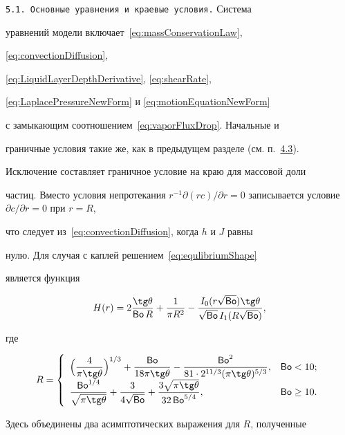 \texttt{5.1. Основные уравнения и краевые условия.} Система

уравнений модели включает~\eqref{eq:massConservationLaw},

\eqref{eq:convectionDiffusion},

\eqref{eq:LiquidLayerDepthDerivative}, \eqref{eq:shearRate},

\eqref{eq:LaplacePressureNewForm} и \eqref{eq:motionEquationNewForm}

с замыкающим соотношением~\eqref{eq:vaporFluxDrop}. Начальные и

граничные условия такие же, как в предыдущем разделе (см. п.~\hyperlink{kol:4.3}{4.3}).

Исключение составляет граничное условие на краю для массовой доли

частиц. Вместо условия непротекания $r^{-1}\partial (rc)/\partial r

= 0$ записывается условие $\partial c/\partial r = 0$ при $r = R$,

что следует из~\eqref{eq:convectionDiffusion}, когда $h$ и $J$ равны

нулю. Для случая с каплей решением~\eqref{eq:equlibriumShape}

является функция

$$

H(r) = 2\frac{\tg \theta}{\Bo R} + \frac{1}{\pi R^2} - \frac{I_0

( r\sqrt{\Bo} ) \tg \theta}{\sqrt{\Bo}\, I_1 (

R\sqrt{\Bo} )},

$$

где

$$

R = \left\{ \begin{array}{l l}

\displaystyle

\Bigl( \frac{4}{\pi \tg \theta} \Bigr)^{1/3} + \frac{\Bo}{18\pi \tg \theta } - \frac{\Bo^2}{81

\cdot 2^{11/3} ( \pi \tg \theta )^{5/3}}, & \Bo < 10;\\[2mm]

\displaystyle

\frac{\Bo^{1/4}}{\sqrt{\pi \tg \theta}} + \frac{3}{4 \sqrt {\Bo}} +

\frac{3 \sqrt{\pi \tg \theta}}{32 \Bo^{5/4}}, & \Bo \ge 10.

\end{array} \right.

$$

Здесь объединены два асимптотических выражения для $R$, полученные

